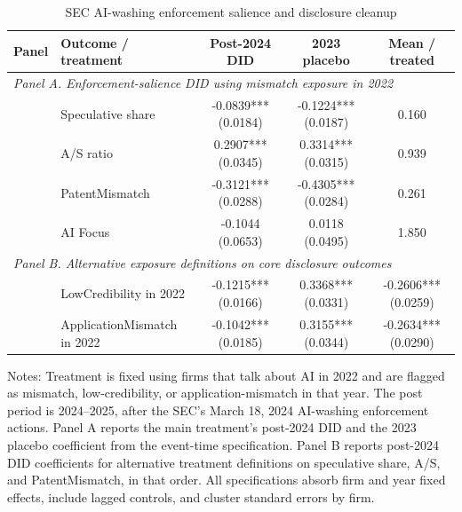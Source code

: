 \begin{table}[!htbp]
\centering
\caption{SEC AI-washing enforcement salience and disclosure cleanup}
\small
\begin{tabular}{llccc}
\hline
Panel & Outcome / treatment & Post-2024 DID & 2023 placebo & Mean / treated \\
\hline
\multicolumn{5}{l}{\textit{Panel A. Enforcement-salience DID using mismatch exposure in 2022}} \\
 & Speculative share & -0.0839*** (0.0184) & -0.1224*** (0.0187) & 0.160 \\
 & A/S ratio & 0.2907*** (0.0345) & 0.3314*** (0.0315) & 0.939 \\
 & PatentMismatch & -0.3121*** (0.0288) & -0.4305*** (0.0284) & 0.261 \\
 & AI Focus & -0.1044 (0.0653) & 0.0118 (0.0495) & 1.850 \\
\multicolumn{5}{l}{\textit{Panel B. Alternative exposure definitions on core disclosure outcomes}} \\
 & LowCredibility in 2022 & -0.1215*** (0.0166) & 0.3368*** (0.0331) & -0.2606*** (0.0259) \\
 & ApplicationMismatch in 2022 & -0.1042*** (0.0185) & 0.3155*** (0.0344) & -0.2634*** (0.0290) \\
\hline
\end{tabular}
\begin{flushleft}
\footnotesize Notes: Treatment is fixed using firms that talk about AI in 2022 and are flagged as mismatch, low-credibility, or application-mismatch in that year. The post period is 2024--2025, after the SEC's March 18, 2024 AI-washing enforcement actions. Panel A reports the main treatment's post-2024 DID and the 2023 placebo coefficient from the event-time specification. Panel B reports post-2024 DID coefficients for alternative treatment definitions on speculative share, A/S, and PatentMismatch, in that order. All specifications absorb firm and year fixed effects, include lagged controls, and cluster standard errors by firm.
\end{flushleft}
\end{table}
